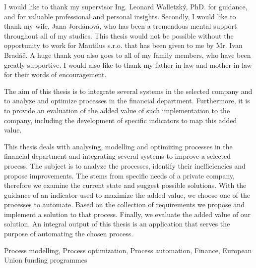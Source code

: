\documentclass[12pt,oneside]{fithesis2}
\begin{document}
\FrontMatter
\ThesisTitlePage
\begin{ThesisDeclaration}
  \DeclarationText
  \AdvisorName
\end{ThesisDeclaration}
\begin{ThesisThanks}
  I would like to thank my supervisor Ing. Leonard Walletzký, PhD. for guidance, and for valuable professional and personal insights. Secondly, I would like to thank my wife, Jana Jordánová, who has been a tremendous mental support throughout all of my studies. This thesis would not be possible without the opportunity to work for Mautilus s.r.o. that has been given to me by Mr. Ivan Bradáč. A huge thank you also goes to all of my family members, who have been greatly supportive. I would also like to thank my father-in-law and mother-in-law for their words of encouragement.
\end{ThesisThanks}
The aim of this thesis is to integrate several systems in the selected company and to analyze and optimize processes in the financial department. Furthermore, it is to provide an evaluation of the added value of such implementation to the company, including the development of specific indicators to map this added value.
\begin{ThesisAbstract}
  This thesis deals with analysing, modelling and optimizing processes in the financial department and integrating several systems to improve a selected process. The subject is to analyze the processes, identify their inefficiencies and propose improvements. The stems from specific needs of a private company, therefore we examine the current state and suggest possible solutions. With the guidance of an indicator used to maximize the added value, we choose one of the processes to automate. Based on the collection of requirements we propose and implement a solution to that process. Finally, we evaluate the added value of our solution. An integral output of this thesis is an application that serves the purpose of automating the chosen process.
\end{ThesisAbstract}
\begin{ThesisKeyWords}Process modelling, Process optimization, Process automation, Finance, European Union funding programmes
\end{ThesisKeyWords}
\tableofcontents
\MainMatter
\end{document}
